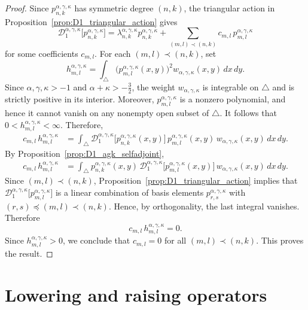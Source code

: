 \documentclass[reqno,10pt]{amsart}
\theoremstyle{plain}
\numberwithin{equation}{section}
\numberwithin{figure}{section}
\begin{document}
\begin{proof}
Since $p_{n,k}^{\alpha,\gamma,\kappa}$ has symmetric degree $(n,k)$, the
triangular action in Proposition~\ref{prop:D1_triangular_action} gives
\[
\mathcal{D}_{1}^{\alpha,\gamma,\kappa}
\big[p_{n,k}^{\alpha,\gamma,\kappa}\big]
=
\lambda_{n,k}^{\alpha,\gamma,\kappa}
p_{n,k}^{\alpha,\gamma,\kappa}
+
\sum_{(m,l)\prec(n,k)}
c_{m,l}\,
p_{m,l}^{\alpha,\gamma,\kappa}
\]
for some coefficients $c_{m,l}$. For each $(m,l)\prec(n,k)$, set
\[
h_{m,l}^{\alpha,\gamma,\kappa}
=
\int_{\triangle}
\bigl(p_{m,l}^{\alpha,\gamma,\kappa}(x,y)\bigr)^2
w_{\alpha,\gamma,\kappa}(x,y)\,dx\,dy .
\]
Since $\alpha,\gamma,\kappa>-1$ and \(\alpha+\kappa>-\frac32\), the weight
$w_{\alpha,\gamma,\kappa}$ is integrable on $\triangle$ and is strictly
positive in its interior. Moreover,
$p_{m,l}^{\alpha,\gamma,\kappa}$ is a nonzero polynomial, and hence it
cannot vanish on any nonempty open subset of $\triangle$. It follows that $0<h_{m,l}^{\alpha,\gamma,\kappa}<\infty$. Therefore,
\begin{align*}
c_{m,l}\,h_{m,l}^{\alpha,\gamma,\kappa}
&=
\int_{\triangle}
\mathcal{D}_{1}^{\alpha,\gamma,\kappa}
\big[p_{n,k}^{\alpha,\gamma,\kappa}(x,y)\big]\,
p_{m,l}^{\alpha,\gamma,\kappa}(x,y)\,
w_{\alpha,\gamma,\kappa}(x,y)\,dx\,dy .
\end{align*}
By Proposition~\ref{prop:D1_agk_selfadjoint},
\begin{align*}
c_{m,l}\,h_{m,l}^{\alpha,\gamma,\kappa}
&=
\int_{\triangle}
p_{n,k}^{\alpha,\gamma,\kappa}(x,y)\,
\mathcal{D}_{1}^{\alpha,\gamma,\kappa}
\big[p_{m,l}^{\alpha,\gamma,\kappa}(x,y)\big]\,
w_{\alpha,\gamma,\kappa}(x,y)\,dx\,dy .
\end{align*}
Since $(m,l)\prec(n,k)$,
Proposition~\ref{prop:D1_triangular_action} implies that $\mathcal{D}_{1}^{\alpha,\gamma,\kappa}
\big[p_{m,l}^{\alpha,\gamma,\kappa}\big]$ is a linear combination of basis elements
$p_{r,s}^{\alpha,\gamma,\kappa}$ with
$(r,s)\preceq(m,l)\prec(n,k)$. Hence, by orthogonality, the last integral
vanishes. Therefore
\[
c_{m,l}\,h_{m,l}^{\alpha,\gamma,\kappa}=0.
\]
Since $h_{m,l}^{\alpha,\gamma,\kappa}>0$, we conclude that
$c_{m,l}=0$ for all $(m,l)\prec(n,k)$. This proves the result.
\end{proof}

\section{Lowering and raising operators}\label{sec:ladder}
\end{document}
